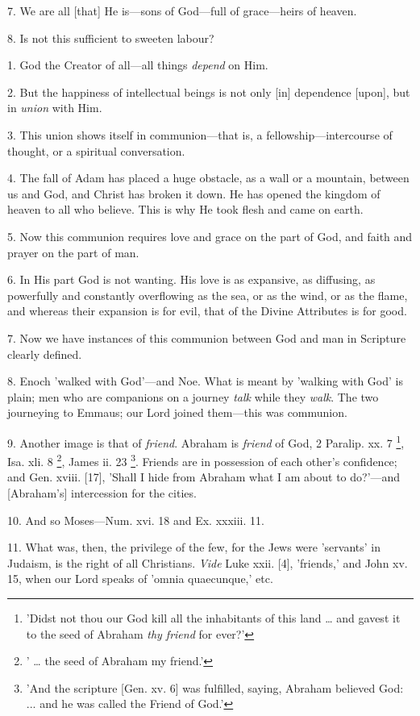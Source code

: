 7. We are all [that] He is—sons of God—full
of grace—heirs of heaven.

8. Is not this sufficient to sweeten labour?


1. God the Creator of all—all things \emph{depend}
on Him.

2. But the happiness of intellectual beings is
not only [in] dependence [upon], but in \emph{union} with Him.

3. This union shows itself in communion—that
is, a fellowship—intercourse of thought, or a spiritual
conversation.

4. The fall of Adam has placed a huge obstacle,
as a wall or a mountain, between us and God, and Christ has broken it
down. He has opened the kingdom of heaven to all who believe. This is
why He took flesh and came on earth.

5. Now this communion requires love and grace on
the part of God, and faith and prayer on the part of man.

6. In His part God is not wanting. His love is as
expansive, as diffusing, as powerfully and constantly overflowing as
the sea, or as the wind, or as the flame, and whereas their expansion
is for evil, that of the Divine Attributes is for good.

7. Now we have instances of this communion
between God and man in Scripture clearly defined.

8. Enoch 'walked with God'—and Noe. What is
meant by 'walking with God' is plain; men who are companions on a
journey \emph{talk} while they \emph{walk}. The two journeying to
Emmaus; our Lord joined them—this was communion.

9. Another image is that of \emph{friend}.
Abraham is \emph{friend} of God, 2 Paralip. xx. 7 \footnote{'Didst not thou our God
kill all the inhabitants of this land … and gavest it to the seed of
Abraham \emph{thy friend} for ever?'}, Isa. xli. 8 \footnote{' … the seed of
Abraham my friend.'},
James ii. 23 \footnote{'And the scripture [Gen.
xv. 6] was fulfilled, saying, Abraham believed God: ... and he was
called the Friend of God.'}. Friends
are in possession of each other's confidence; and Gen. xviii. [17],
'Shall I hide from Abraham what I am about to do?'—and [Abraham's]
intercession for the cities.

10. And so Moses—Num. xvi. 18 and Ex. xxxiii.
11.

11. What was, then, the privilege of the few, for
the Jews were 'servants' in Judaism, is the right of all Christians. \emph{Vide}
Luke xxii. [4], 'friends,' and John xv. 15, when our Lord speaks of 'omnia
quaecunque,' etc.

